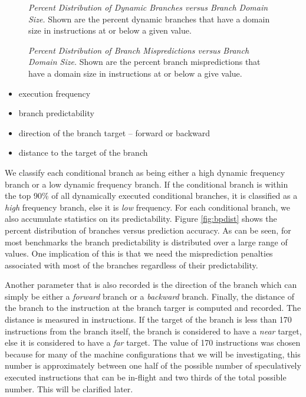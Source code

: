 \documentclass[10pt,dvips]{article}
\begin{document}
\begin{figure}
\vspace{0.2 in}
\setlength{\epsfxsize}{10cm}%
\centerline{}
\caption{{\em Percent Distribution of Dynamic Branches versus
Branch Domain Size.} 
Shown are the percent dynamic branches that have a domain size
in instructions at or below a given value.}
\label{fig:numbranches}
\end{figure}

\begin{figure}
\vspace{0.2 in}
\setlength{\epsfxsize}{10cm}%
\centerline{}
\caption{{\em Percent Distribution of Branch Mispredictions
versus Branch Domain Size.} 
Shown are the percent branch mispredictions that have a domain
size in instructions
at or below a give value.}
\label{fig:mispredictions}
\end{figure}

\begin{itemize}
\item{execution frequency}
\item{branch predictability}
\item{direction of the branch target -- forward or backward}
\item{distance to the target of the branch}
\end{itemize}   

We classify each conditional branch as 
being either a high dynamic frequency branch
or a low dynamic frequency branch.  
If the conditional branch
is within the top 90\% of all dynamically executed conditional branches,
it is classified as a \textit{high} frequency branch, else it 
is \textit{low} frequency.
For each conditional branch, we also accumulate statistics on
its predictability.  Figure \ref{fig:bpdist} shows 
the percent distribution of branches versus prediction accuracy.
As can be seen, for most benchmarks
the branch predictability is distributed over a large range of values.
One implication of this is that we need the misprediction
penalties associated with most of the branches 
regardless of their predictability.

Another parameter that is also recorded is the direction of the branch 
which can simply
be either a 
\textit{forward} branch or a 
\textit{backward} branch.
Finally, the distance of the branch to 
the instruction at the
branch targer is computed and recorded.  The distance is measured
in instructions.  If the target of the branch is less than 170 instructions
from the branch itself, the branch is considered to have a 
\textit{near} target, else it is considered to have a
\textit{far} target.  The value of 170 instructions was chosen
because for many of the machine configurations that we will be
investigating, this number is approximately between one half of
the possible number of speculatively executed instructions
that can be in-flight and two thirds of the total possible number.
This will be clarified later.
\end{document}
